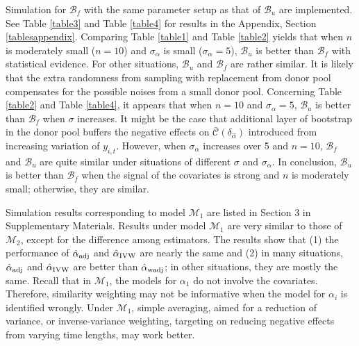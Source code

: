 \documentclass[11pt]{article}
\def\mc#1{\mathcal{#1}} %
\theoremstyle{definition}
\begin{document}
Simulation for $\mc{B}_f$ with the same parameter setup as that of $\mc{B}_u$ are implemented. See Table \ref{table3} and Table \ref{table4} for results in the Appendix, Section \ref{tablesappendix}. Comparing Table \ref{table1}
 and Table \ref{table2} yields that when $n$ is moderately small ($n = 10$) and $\sigma_{\alpha}$ is small ($\sigma_{\alpha}=5$), $\mc{B}_u$ is better than $\mc{B}_f$ with statistical evidence. For other situations, $\mc{B}_u$  and $\mc{B}_f$  are rather similar. It is likely that the extra randomness from sampling with replacement from donor pool compensates for the possible noises from a small donor pool. Concerning  Table \ref{table2} and Table \ref{table4}, it appears that when $n = 10$ and $\sigma_{\alpha}=5$, $\mc{B}_u$ is better than  $\mc{B}_f$  when $\sigma$ increases. It might be the case that additional layer of bootstrap in the donor pool buffers the negative effects on $\bar{\mc{C}}(\delta_{\hat{\alpha}})$  introduced from increasing variation of $y_{i,t}$. However, when $\sigma_{\alpha}$ increases over 5 and $n = 10$,  $\mc{B}_f$ and $\mc{B}_u$ are quite similar under  situations of different $\sigma$ and $\sigma_{\alpha}$. In conclusion, $\mc{B}_u$ is better than $\mc{B}_f$ when the signal of the covariates is strong and $n$ is moderately small; otherwise, they are similar. %
 

 Simulation results corresponding to model $\mc{M}_1$ are listed in Section 3 in Supplementary Materials. Results under model $\mc{M}_1$ are very similar to those of $\mc{M}_2$, except for the difference among estimators. The results show that (1) the performance of $\hat{\alpha}_{\rm adj}$ and  $\hat{\alpha}_{\rm IVW}$ are nearly the same and (2) in many situations, $\hat{\alpha}_{\rm adj}$ and  $\hat{\alpha}_{\rm IVW}$ are  better than $\hat{\alpha}_{\rm wadj}$; in other situations, they are mostly the same. Recall that in $\mc{M}_1$, the models for $\alpha_1$ do not involve the covariates. Therefore, similarity weighting may not be informative when the model for $\alpha_i$ is identified wrongly. Under $\mc{M}_1$, simple averaging, aimed for a reduction of variance, or inverse-variance weighting, targeting on reducing negative effects from varying time lengths, may work better.
\end{document}
